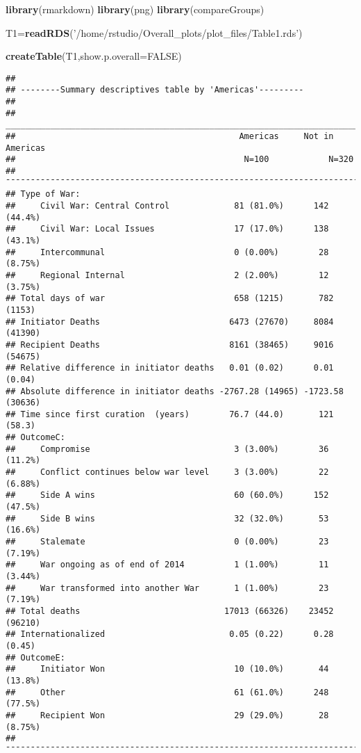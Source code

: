 \documentclass[
]{article}
\newenvironment{Shaded}{\begin{snugshade}}{\end{snugshade}}
\newcommand{\DataTypeTok}[1]{\textcolor[rgb]{0.13,0.29,0.53}{#1}}
\newcommand{\KeywordTok}[1]{\textcolor[rgb]{0.13,0.29,0.53}{\textbf{#1}}}
\newcommand{\NormalTok}[1]{#1}
\newcommand{\OtherTok}[1]{\textcolor[rgb]{0.56,0.35,0.01}{#1}}
\newcommand{\StringTok}[1]{\textcolor[rgb]{0.31,0.60,0.02}{#1}}
\begin{document}
\begin{Shaded}
\begin{Highlighting}[]
\KeywordTok{library}\NormalTok{(rmarkdown)}
\KeywordTok{library}\NormalTok{(png)}
\KeywordTok{library}\NormalTok{(compareGroups)}

\NormalTok{T1=}\KeywordTok{readRDS}\NormalTok{(}\StringTok{'/home/rstudio/Overall_plots/plot_files/Table1.rds'}\NormalTok{)}

\KeywordTok{createTable}\NormalTok{(T1,}\DataTypeTok{show.p.overall=}\OtherTok{FALSE}\NormalTok{)}
\end{Highlighting}
\end{Shaded}

\begin{verbatim}
## 
## --------Summary descriptives table by 'Americas'---------
## 
## _________________________________________________________________________ 
##                                             Americas     Not in Americas  
##                                              N=100            N=320       
## ¯¯¯¯¯¯¯¯¯¯¯¯¯¯¯¯¯¯¯¯¯¯¯¯¯¯¯¯¯¯¯¯¯¯¯¯¯¯¯¯¯¯¯¯¯¯¯¯¯¯¯¯¯¯¯¯¯¯¯¯¯¯¯¯¯¯¯¯¯¯¯¯¯ 
## Type of War:                                                              
##     Civil War: Central Control             81 (81.0%)      142 (44.4%)    
##     Civil War: Local Issues                17 (17.0%)      138 (43.1%)    
##     Intercommunal                          0 (0.00%)        28 (8.75%)    
##     Regional Internal                      2 (2.00%)        12 (3.75%)    
## Total days of war                          658 (1215)       782 (1153)    
## Initiator Deaths                          6473 (27670)     8084 (41390)   
## Recipient Deaths                          8161 (38465)     9016 (54675)   
## Relative difference in initiator deaths   0.01 (0.02)      0.01 (0.04)    
## Absolute difference in initiator deaths -2767.28 (14965) -1723.58 (30636) 
## Time since first curation  (years)        76.7 (44.0)       121 (58.3)    
## OutcomeC:                                                                 
##     Compromise                             3 (3.00%)        36 (11.2%)    
##     Conflict continues below war level     3 (3.00%)        22 (6.88%)    
##     Side A wins                            60 (60.0%)      152 (47.5%)    
##     Side B wins                            32 (32.0%)       53 (16.6%)    
##     Stalemate                              0 (0.00%)        23 (7.19%)    
##     War ongoing as of end of 2014          1 (1.00%)        11 (3.44%)    
##     War transformed into another War       1 (1.00%)        23 (7.19%)    
## Total deaths                             17013 (66326)    23452 (96210)   
## Internationalized                         0.05 (0.22)      0.28 (0.45)    
## OutcomeE:                                                                 
##     Initiator Won                          10 (10.0%)       44 (13.8%)    
##     Other                                  61 (61.0%)      248 (77.5%)    
##     Recipient Won                          29 (29.0%)       28 (8.75%)    
## ¯¯¯¯¯¯¯¯¯¯¯¯¯¯¯¯¯¯¯¯¯¯¯¯¯¯¯¯¯¯¯¯¯¯¯¯¯¯¯¯¯¯¯¯¯¯¯¯¯¯¯¯¯¯¯¯¯¯¯¯¯¯¯¯¯¯¯¯¯¯¯¯¯
\end{verbatim}
\end{document}
